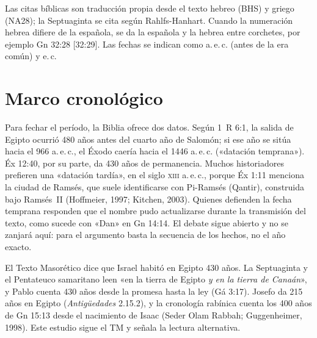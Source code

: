 \documentclass[11pt,letterpaper]{article}
\begin{document}
\begin{nota}
Las citas bíblicas son traducción propia desde el texto hebreo (BHS) y griego (NA28); la Septuaginta se cita según Rahlfs-Hanhart. Cuando la numeración hebrea difiere de la española, se da la española y la hebrea entre corchetes, por ejemplo Gn 32:28 [32:29]. Las fechas se indican como a.\,e.\,c. (antes de la era común) y e.\,c.
\end{nota}

\section{Marco cronológico}

Para fechar el período, la Biblia ofrece dos datos. Según 1~R 6:1, la salida de Egipto ocurrió 480 años antes del cuarto año de Salomón; si ese año se sitúa hacia el 966 a.\,e.\,c., el Éxodo caería hacia el 1446 a.\,e.\,c. («datación temprana»). Éx 12:40, por su parte, da 430 años de permanencia. Muchos historiadores prefieren una «datación tardía», en el siglo \textsc{xiii} a.\,e.\,c., porque Éx 1:11 menciona la ciudad de Ramsés, que suele identificarse con Pi-Ramsés (Qantir), construida bajo Ramsés~II (Hoffmeier, 1997; Kitchen, 2003). Quienes defienden la fecha temprana responden que el nombre pudo actualizarse durante la transmisión del texto, como sucede con «Dan» en Gn 14:14. El debate sigue abierto y no se zanjará aquí: para el argumento basta la secuencia de los hechos, no el año exacto.

\begin{nota}
El Texto Masorético dice que Israel habitó en Egipto 430 años. La Septuaginta y el Pentateuco samaritano leen «en la tierra de Egipto \emph{y en la tierra de Canaán}», y Pablo cuenta 430 años desde la promesa hasta la ley (Gá 3:17). Josefo da 215 años en Egipto (\emph{Antigüedades} 2.15.2), y la cronología rabínica cuenta los 400 años de Gn 15:13 desde el nacimiento de Isaac (Seder Olam Rabbah; Guggenheimer, 1998). Este estudio sigue el TM y señala la lectura alternativa.
\end{nota}
\end{document}
